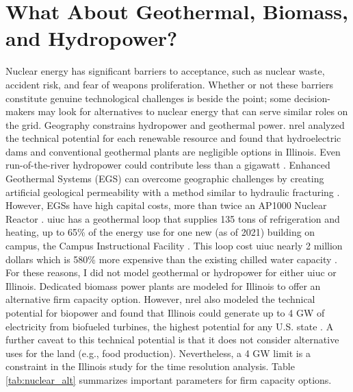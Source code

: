 \section{What About Geothermal, Biomass, and Hydropower?}
\label{section:alt_firm}

Nuclear energy has significant barriers to acceptance, such as nuclear waste,
accident risk, and fear of weapons proliferation. Whether or not these barriers
constitute genuine technological challenges is beside the point; some decision-makers
may look for alternatives to nuclear energy that can serve similar roles
on the grid. Geography constrains hydropower and geothermal power. \gls{nrel} analyzed
the technical potential for each renewable resource and found that hydroelectric dams
and conventional geothermal plants are negligible options in Illinois. Even run-of-the-river
hydropower could contribute less than a gigawatt \cite{lopez_us_2012}. Enhanced Geothermal
Systems (EGS) can overcome geographic challenges by creating artificial geological permeability
with a method similar to hydraulic fracturing \cite{geothermal_technologies_office_what_2012}.
However, EGSs have high capital costs, more than twice an AP1000 Nuclear Reactor
\cite{nrel_2020_2020}. \gls{uiuc} has a geothermal loop that supplies 135 tons of refrigeration
and heating, up to 65\% of the energy use for one new (as of 2021) building on campus,
the Campus Instructional Facility \cite{noauthor_geothermal_nodate}.
This loop cost \gls{uiuc} nearly 2 million dollars which is 580\% more expensive
than the existing chilled water capacity
\cite{noauthor_geothermal_nodate,affiliated_engineers_inc_utilities_2015}. For these
reasons, I did not model geothermal or hydropower for either \gls{uiuc} or Illinois.
Dedicated biomass power plants are modeled for Illinois to offer an alternative
firm capacity option. However, \gls{nrel} also modeled the technical potential for biopower
and found that Illinois could generate up to 4 GW of electricity from biofueled turbines, the highest potential
for any U.S. state \cite{lopez_us_2012}. A further caveat to this technical potential is that it does not
consider alternative uses for the land (e.g., food production). Nevertheless, a 4 GW limit is a constraint in the Illinois study for the time resolution analysis.
Table \ref{tab:nuclear_alt} summarizes important parameters for firm capacity options.

